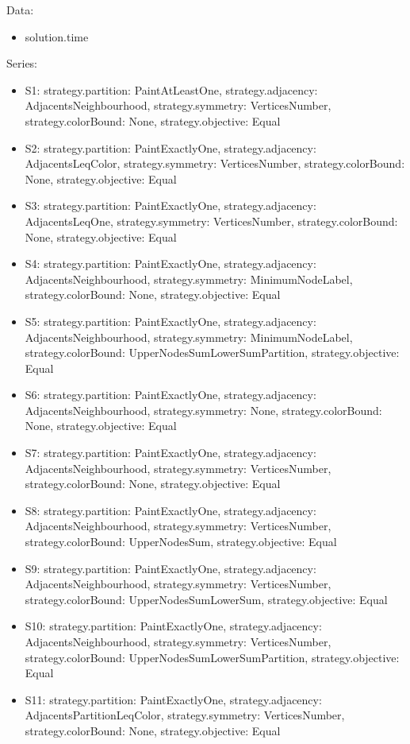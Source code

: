 \documentclass[landscape, 12pt]{report}
\begin{document}
Data:
\begin{itemize}
\item solution.time
\end{itemize}
Series:
\begin{itemize}
\item S1: strategy.partition: PaintAtLeastOne, strategy.adjacency: AdjacentsNeighbourhood, strategy.symmetry: VerticesNumber, strategy.colorBound: None, strategy.objective: Equal
\item S2: strategy.partition: PaintExactlyOne, strategy.adjacency: AdjacentsLeqColor, strategy.symmetry: VerticesNumber, strategy.colorBound: None, strategy.objective: Equal
\item S3: strategy.partition: PaintExactlyOne, strategy.adjacency: AdjacentsLeqOne, strategy.symmetry: VerticesNumber, strategy.colorBound: None, strategy.objective: Equal
\item S4: strategy.partition: PaintExactlyOne, strategy.adjacency: AdjacentsNeighbourhood, strategy.symmetry: MinimumNodeLabel, strategy.colorBound: None, strategy.objective: Equal
\item S5: strategy.partition: PaintExactlyOne, strategy.adjacency: AdjacentsNeighbourhood, strategy.symmetry: MinimumNodeLabel, strategy.colorBound: UpperNodesSumLowerSumPartition, strategy.objective: Equal
\item S6: strategy.partition: PaintExactlyOne, strategy.adjacency: AdjacentsNeighbourhood, strategy.symmetry: None, strategy.colorBound: None, strategy.objective: Equal
\item S7: strategy.partition: PaintExactlyOne, strategy.adjacency: AdjacentsNeighbourhood, strategy.symmetry: VerticesNumber, strategy.colorBound: None, strategy.objective: Equal
\item S8: strategy.partition: PaintExactlyOne, strategy.adjacency: AdjacentsNeighbourhood, strategy.symmetry: VerticesNumber, strategy.colorBound: UpperNodesSum, strategy.objective: Equal
\item S9: strategy.partition: PaintExactlyOne, strategy.adjacency: AdjacentsNeighbourhood, strategy.symmetry: VerticesNumber, strategy.colorBound: UpperNodesSumLowerSum, strategy.objective: Equal
\item S10: strategy.partition: PaintExactlyOne, strategy.adjacency: AdjacentsNeighbourhood, strategy.symmetry: VerticesNumber, strategy.colorBound: UpperNodesSumLowerSumPartition, strategy.objective: Equal
\item S11: strategy.partition: PaintExactlyOne, strategy.adjacency: AdjacentsPartitionLeqColor, strategy.symmetry: VerticesNumber, strategy.colorBound: None, strategy.objective: Equal
\end{itemize}
\end{document}

